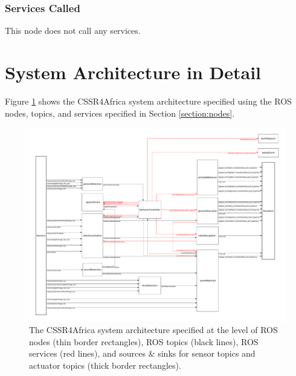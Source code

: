 \documentclass{CSSRforAfrica}
\begin{document}
{\subsubsection*{Services Called}
This node does not call any services.



\newpage
\section{System Architecture in Detail}
Figure \ref{fig:architecture2} shows the CSSR4Africa system architecture specified using the ROS nodes, topics, and services specified in Section \ref{section:nodes}.

\begin{figure}[thb]
\hspace{-4mm}
\includegraphics[width=165mm,angle=0]{System_Architecture_Nodes.pdf}

\caption{The CSSR4Africa system architecture specified at the level of ROS nodes (thin border rectangles), ROS topics (black lines), ROS services (red lines), and sources \& sinks for sensor topics and actuator topics (thick border rectangles).}  
\label{fig:architecture2}       
\end{figure}

\clearpage

}
\end{document}
